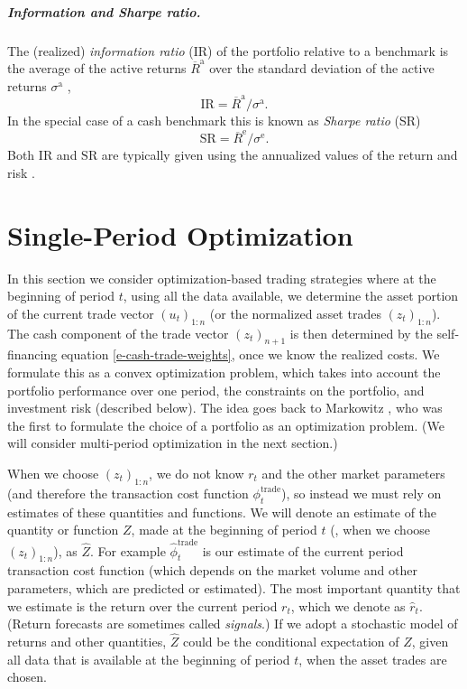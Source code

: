 \documentclass[openany]{now}
\newcommand{\SR}{\mathrm{SR}}
\newcommand{\IR}{\mathrm{IR}}
\newcommand{\trcost}{\phi^\mathrm{trade}}
\newcommand{\trcosthat}{\hat \phi^\mathrm{trade}}
\newcommand{\Rep}{R^\mathrm{e}}
\newcommand{\Rap}{R^\mathrm{a}}
\begin{document}
\paragraph{Information and Sharpe ratio.}
The (realized) \emph{information ratio} (IR) of the portfolio relative
to a benchmark is the average of the
active returns $\overline \Rap$ over the standard deviation of the
active returns $\sigma^\mathrm{a}$ \cite{grinold1999active},
\[
\IR = \overline \Rap / \sigma^\mathrm{a}.
\]
In the special case of a cash benchmark this is known as \emph{Sharpe ratio} (SR)
\cite{sharpe1966,sharpe1994}
\[
\SR = \overline \Rep / \sigma^\mathrm{e}.
\]
Both $\IR$ and $\SR$ are typically given using the annualized
values of the return and risk \cite{bacon2008practical}.


\chapter{Single-Period Optimization}
\label{s-spo}

In this section we consider optimization-based trading strategies
where at the beginning of period $t$, using all the data available,
we determine the asset portion of the current trade vector $(u_t)_{1:n}$
(or the normalized asset trades $(z_t)_{1:n}$).
The cash component of the trade vector $(z_t)_{n+1}$
is then determined by the self-financing equation \eqref{e-cash-trade-weights},
once we know the realized costs.
We formulate this as a convex optimization problem,
which takes into account the portfolio performance over one period,
the constraints on the portfolio, and investment risk (described below).
The idea goes back to Markowitz \cite{markowitz1952portfolio},
who was the first to formulate the choice of a portfolio
as an optimization problem.
(We will consider multi-period optimization in the next section.)


When we choose $(z_t)_{1:n}$, we do not know $r_t$ and the other
market parameters (and therefore the transaction cost function $\trcost_t$), so
instead we must rely on estimates of these quantities and functions.
We will denote an estimate of the quantity or function $Z$, made at the beginning
of period $t$
(\ie, when we choose $(z_t)_{1:n}$), as $\hat Z$.
For example $\trcosthat_t$ is our
estimate of the current period transaction cost function
(which depends on the market volume and other parameters,
which are predicted or estimated).
The most important quantity that we estimate is the return over the
current period $r_t$, which we denote as $\hat r_t$.
(Return forecasts are sometimes called \emph{signals}.)
If we adopt a stochastic model of returns and other quantities,
$\hat Z$ could be the conditional
expectation of $Z$, given all data that is available
at the beginning of period $t$, when the asset trades are chosen.
\end{document}
